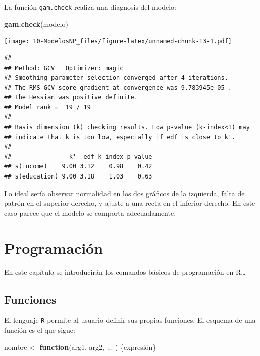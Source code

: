 \documentclass[]{book}
\newenvironment{Shaded}{\begin{snugshade}}{\end{snugshade}}
\newcommand{\ControlFlowTok}[1]{\textcolor[rgb]{0.13,0.29,0.53}{\textbf{#1}}}
\newcommand{\KeywordTok}[1]{\textcolor[rgb]{0.13,0.29,0.53}{\textbf{#1}}}
\newcommand{\NormalTok}[1]{#1}
\newcommand{\StringTok}[1]{\textcolor[rgb]{0.31,0.60,0.02}{#1}}
\begin{document}
La función \texttt{gam.check} realiza una diagnosis del modelo:

\begin{Shaded}
\begin{Highlighting}[]
\KeywordTok{gam.check}\NormalTok{(modelo)}
\end{Highlighting}
\end{Shaded}

\texttt{[image: 10-ModelosNP\_files/figure-latex/unnamed-chunk-13-1.pdf]}

\begin{verbatim}
## 
## Method: GCV   Optimizer: magic
## Smoothing parameter selection converged after 4 iterations.
## The RMS GCV score gradient at convergence was 9.783945e-05 .
## The Hessian was positive definite.
## Model rank =  19 / 19 
## 
## Basis dimension (k) checking results. Low p-value (k-index<1) may
## indicate that k is too low, especially if edf is close to k'.
## 
##                k'  edf k-index p-value
## s(income)    9.00 3.12    0.98    0.42
## s(education) 9.00 3.18    1.03    0.63
\end{verbatim}

Lo ideal sería observar normalidad en los dos gráficos de la izquierda, falta de patrón en el superior derecho, y ajuste a una recta en el inferior derecho. En este caso parece que el modelo se comporta adecuadamente.

\hypertarget{programacion}{%
\chapter{Programación}\label{programacion}}

En este capítulo se introducirán los comandos básicos de programación en R\ldots{}

\hypertarget{funciones}{%
\section{Funciones}\label{funciones}}

El lenguaje \texttt{R} permite al usuario
definir sus propias funciones. El esquema de una función es el que
sigue:

\begin{Shaded}
\begin{Highlighting}[]
\NormalTok{nombre <-}\StringTok{ }\ControlFlowTok{function}\NormalTok{(arg1, arg2, ... ) \{expresión\}}
\end{Highlighting}
\end{Shaded}
\end{document}
